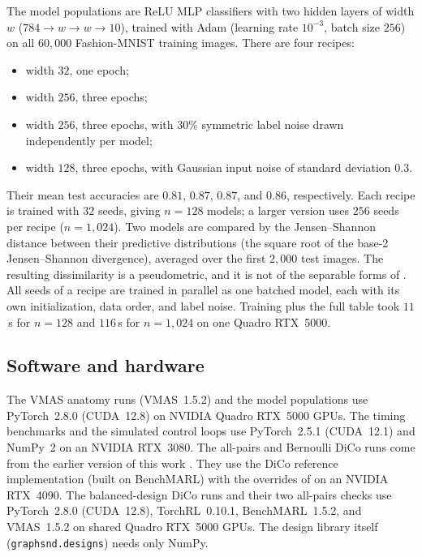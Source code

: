 The model populations are ReLU MLP classifiers with two hidden layers of width $w$
(\mbox{$784\to w\to w\to 10$}), trained with Adam (learning rate $10^{-3}$, batch size $256$)
on all $60{,}000$ Fashion-MNIST \citep{xiao2017fashion} training images. There are four recipes:
\begin{itemize}
\item width $32$, one epoch;
\item width $256$, three epochs;
\item width $256$, three epochs, with $30\%$ symmetric label noise drawn
independently per model;
\item width $128$, three epochs, with Gaussian input noise of standard deviation
$0.3$.
\end{itemize}
Their mean test accuracies are $0.81$, $0.87$, $0.87$, and $0.86$, respectively. Each recipe is
trained with $32$ seeds, giving $n=128$ models; a larger version uses $256$
seeds per recipe ($n=1{,}024$). Two models are compared by the Jensen--Shannon
distance between their predictive distributions (the square root of the base-2
Jensen--Shannon divergence), averaged over the first $2{,}000$ test images.
The resulting dissimilarity is a pseudometric, and it is not of the separable
forms of . All seeds of a recipe are trained in parallel as
one batched model, each with its own initialization, data order, and label noise.
Training plus the full table took $11$\,s for $n=128$ and $116$\,s for
$n=1{,}024$ on one Quadro RTX~5000.



\subsection{Software and hardware}
\label{app:exp-details:software}

The VMAS anatomy runs (VMAS~1.5.2) and the model populations use
PyTorch~2.8.0 (CUDA~12.8) on NVIDIA Quadro RTX~5000 GPUs. The timing benchmarks
and the simulated control loops use PyTorch~2.5.1 (CUDA~12.1) and NumPy~2 on an
NVIDIA RTX~3080. The all-pairs and Bernoulli DiCo runs come from the earlier version of this work \citep{ray2026graphsnd}. They use
the DiCo reference implementation (built on BenchMARL) with the overrides of
 on an NVIDIA RTX~4090. The balanced-design DiCo runs and
their two all-pairs checks use PyTorch~2.8.0 (CUDA~12.8), TorchRL~0.10.1,
BenchMARL~1.5.2, and VMAS~1.5.2 on shared Quadro RTX~5000 GPUs. The design library itself
(\texttt{graphsnd.designs}) needs only NumPy.

